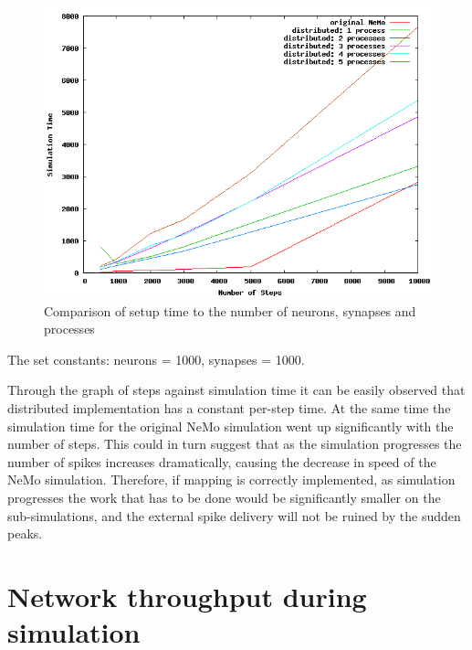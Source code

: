 \begin{figure}[h!]
\begin{center}
\includegraphics[scale = 0.4]{images/evaluation/distributed_steps.png}
\end{center}
\caption{Comparison of setup time to the number of neurons, synapses and processes}
\end{figure}

The set constants: neurons = 1000, synapses = 1000.

Through the graph of steps against simulation time it can be easily observed that distributed implementation has a constant per-step time. At the same time the simulation time for the original NeMo simulation went up significantly with the number of steps. This could in turn suggest that as the simulation progresses the number of spikes increases dramatically, causing the decrease in speed of the NeMo simulation. Therefore, if mapping is correctly implemented, as simulation progresses the work that has to be done would be significantly smaller on the sub-simulations, and the external spike delivery will not be ruined by the sudden peaks.

\clearpage

\section{Network throughput during simulation}

